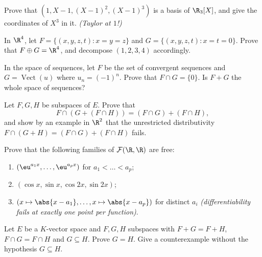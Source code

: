 \begin{exercise}[$\star$]\label{exo:b1:vspaces:4}
Prove that $(1, X - 1, (X-1)^2, (X-1)^3)$ is a basis of $\R_3[X]$,
and give the coordinates of $X^3$ in it. \emph{(Taylor at $1$!)}
\end{exercise}

\begin{exercise}[$\star\star$]\label{exo:b1:vspaces:5}
In $\R^4$, let $F = \{(x,y,z,t) : x = y = z\}$ and $G = \{(x,y,z,t)
: x = t = 0\}$. Prove that $F \oplus G = \R^4$, and decompose
$(1,2,3,4)$ accordingly.
\end{exercise}

\begin{exercise}[$\star\star$]\label{exo:b1:vspaces:6}
In the space of sequences, let $F$ be the set of convergent
sequences and $G = \operatorname{Vect}(u)$ where $u_n = (-1)^n$.
Prove that $F \cap G = \{0\}$. Is $F + G$ the whole space of
sequences?
\end{exercise}

\begin{exercise}[$\star\star$]\label{exo:b1:vspaces:7}
Let $F, G, H$ be subspaces of $E$. Prove that
\[
F \cap (G + (F \cap H)) = (F \cap G) + (F \cap H),
\]
and show by an example in $\R^2$ that the unrestricted
distributivity $F \cap (G + H) = (F\cap G) + (F \cap H)$ fails.
\end{exercise}

\begin{exercise}[$\star\star\star$]\label{exo:b1:vspaces:8}
Prove that the following families of $\mathcal{F}(\R, \R)$ are free:
\begin{enumerate}
  \item $(\eu^{a_1 x}, \dots, \eu^{a_p x})$ for $a_1 < \dots < a_p$;
  \item $(\cos x, \sin x, \cos 2x, \sin 2x)$;
  \item $(x \mapsto \abs{x - a_1}, \dots, x \mapsto \abs{x - a_p})$
        for distinct $a_i$ \emph{(differentiability fails at exactly
        one point per function)}.
\end{enumerate}
\end{exercise}

\begin{exercise}[$\star\star\star$]\label{exo:b1:vspaces:9}
Let $E$ be a $K$-vector space and $F, G, H$ subspaces with $F + G =
F + H$, $F \cap G = F \cap H$ and $G \subseteq H$. Prove $G = H$.
Give a counterexample without the hypothesis $G \subseteq H$.
\end{exercise}

